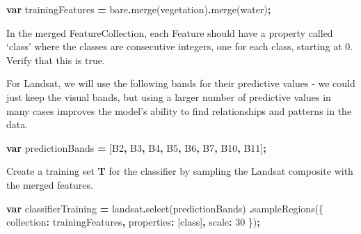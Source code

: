 \documentclass[
]{article}
\newenvironment{Shaded}{\begin{snugshade}}{\end{snugshade}}
\newcommand{\DataTypeTok}[1]{\textcolor[rgb]{0.13,0.29,0.53}{#1}}
\newcommand{\DecValTok}[1]{\textcolor[rgb]{0.00,0.00,0.81}{#1}}
\newcommand{\FunctionTok}[1]{\textcolor[rgb]{0.00,0.00,0.00}{#1}}
\newcommand{\KeywordTok}[1]{\textcolor[rgb]{0.13,0.29,0.53}{\textbf{#1}}}
\newcommand{\NormalTok}[1]{#1}
\newcommand{\OperatorTok}[1]{\textcolor[rgb]{0.81,0.36,0.00}{\textbf{#1}}}
\newcommand{\StringTok}[1]{\textcolor[rgb]{0.31,0.60,0.02}{#1}}
\begin{document}
\begin{Shaded}
\begin{Highlighting}[]
\KeywordTok{var}\NormalTok{ trainingFeatures }\OperatorTok{=}\NormalTok{ bare}\OperatorTok{.}\FunctionTok{merge}\NormalTok{(vegetation)}\OperatorTok{.}\FunctionTok{merge}\NormalTok{(water)}\OperatorTok{;}
\end{Highlighting}
\end{Shaded}

In the merged FeatureCollection, each Feature should have a property called `class' where the classes are consecutive integers, one for each class, starting at 0. Verify that this is true.

For Landsat, we will use the following bands for their predictive values - we could just keep the visual bands, but using a larger number of predictive values in many cases improves the model's ability to find relationships and patterns in the data.

\begin{Shaded}
\begin{Highlighting}[]
\KeywordTok{var}\NormalTok{ predictionBands }\OperatorTok{=}\NormalTok{ [}\StringTok{\textquotesingle{}B2\textquotesingle{}}\OperatorTok{,} \StringTok{\textquotesingle{}B3\textquotesingle{}}\OperatorTok{,} \StringTok{\textquotesingle{}B4\textquotesingle{}}\OperatorTok{,} \StringTok{\textquotesingle{}B5\textquotesingle{}}\OperatorTok{,} \StringTok{\textquotesingle{}B6\textquotesingle{}}\OperatorTok{,} \StringTok{\textquotesingle{}B7\textquotesingle{}}\OperatorTok{,} \StringTok{\textquotesingle{}B10\textquotesingle{}}\OperatorTok{,} \StringTok{\textquotesingle{}B11\textquotesingle{}}\NormalTok{]}\OperatorTok{;}
\end{Highlighting}
\end{Shaded}

Create a training set \textbf{T} for the classifier by sampling the Landsat composite with the merged features.

\begin{Shaded}
\begin{Highlighting}[]
\KeywordTok{var}\NormalTok{ classifierTraining }\OperatorTok{=}\NormalTok{ landsat}\OperatorTok{.}\FunctionTok{select}\NormalTok{(predictionBands)}
  \OperatorTok{.}\FunctionTok{sampleRegions}\NormalTok{(\{}
   \DataTypeTok{collection}\OperatorTok{:}\NormalTok{ trainingFeatures}\OperatorTok{,} 
   \DataTypeTok{properties}\OperatorTok{:}\NormalTok{ [}\StringTok{\textquotesingle{}class\textquotesingle{}}\NormalTok{]}\OperatorTok{,} 
   \DataTypeTok{scale}\OperatorTok{:} \DecValTok{30}
\NormalTok{  \})}\OperatorTok{;}
\end{Highlighting}
\end{Shaded}
\end{document}
